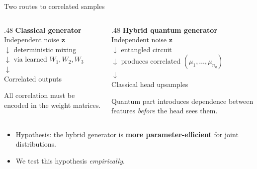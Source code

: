 \begin{frame}{Two routes to correlated samples}
    \begin{columns}[T]
    \begin{column}{.48\textwidth}
        \textbf{Classical generator}\\
        Independent noise $\mathbf{z}$\\
        $\downarrow$ deterministic mixing\\
        $\downarrow$ via learned $W_1, W_2, W_3$\\
        $\downarrow$\\
        Correlated outputs
        \medskip

        All correlation must be encoded in the weight
        matrices.
    \end{column}
    \hfill
    \begin{column}{.48\textwidth}
        \textbf{Hybrid quantum generator}\\
        Independent noise $\mathbf{z}$\\
        $\downarrow$ entangled circuit\\
        $\downarrow$ produces correlated $(\mu_1,\ldots,\mu_{n_q})$\\
        $\downarrow$\\
        Classical head upsamples
        \medskip

        Quantum part introduces dependence between features
        \emph{before} the head sees them.
    \end{column}
    \end{columns}
    \vfill

    \begin{itemize}
        \item {\normalsize Hypothesis: the hybrid generator is \textbf{more parameter-efficient} for joint distributions.}             
        \item {\normalsize We test this hypothesis \textit{empirically}.}    
    \end{itemize} 
    
\end{frame}

